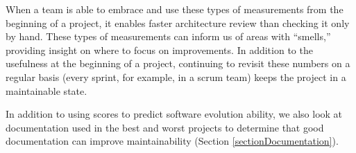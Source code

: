 When a team is able to embrace and use these types of measurements from the beginning of a project, it enables faster architecture review than checking it only by hand. These types of measurements can inform us of areas with ``smells,'' providing insight on where to focus on improvements. In addition to the usefulness at the beginning of a project, continuing to revisit these numbers on a regular basis (every sprint, for example, in a scrum team) keeps the project in a maintainable state.


In addition to using scores to predict software evolution ability, we also look at documentation used in the best and worst projects to determine that good documentation can improve maintainability (Section \ref{sectionDocumentation}).

